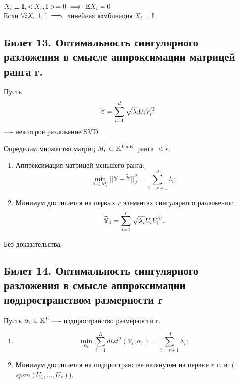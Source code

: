 $X_i \perp \mathbb{I}, < X_i, \mathbb{I} > = 0 \ \Longrightarrow \  \mathbb{E}X_i = 0$\\
Если $\forall i X_i \perp \mathbb{I} \ \Longrightarrow \ $ линейная комбинация $X_i \perp \mathbb{I}$.

\subsection{ Билет 13. Оптимальность сингулярного разложения в смысле аппроксимации матрицей ранга r.}

Пусть \[\mathbb{Y} = \sum_{i=1}^{d}\sqrt{\lambda_i}U_iV_i^{\rm T}\] —- некоторое разложение SVD.

Определим множество матриц $M_r\subset \mathbb{R}^{L\times K}$ ранга $\leq r$.

\begin{sug}

\begin{enumerate}
\item Аппроксимация матрицей меньшего ранга: $$\min_{\mathbb{Y}\in M_r} ||\mathbb{Y}-\mathbb{\widetilde{Y}}||_F^2=\sum_{i=r+1}^{d}\lambda_i; $$
\item Минимум достигается на первых $r$ элементах сингулярного разложения:
\[\mathbb{\widetilde{Y}}_0=\sum_{i=1}^{r} \sqrt{\lambda_i}U_iV_i^{\rm T}.\]
\end{enumerate}
\end{sug}

Без доказательства. 

\subsection{ Билет 14. Оптимальность сингулярного разложения в смысле аппроксимации подпространством размерности r}

Пусть $\alpha_r \in \mathbb{R}^{L}$ —- подпространство размерности $r$.

\begin{sug}

\begin{enumerate}
\item $$\min_{\alpha_r} \sum_{i=1}^{K}dist^2(\mathbb{Y}_i,\alpha_r)=\sum_{i=r+1}^{d}\lambda_i; $$
\item Минимум достигается на подпространстве натянутом на первые $r$ с. в. ($span(U_1,\ldots , U_r)$).
\end{enumerate}
\end{sug}